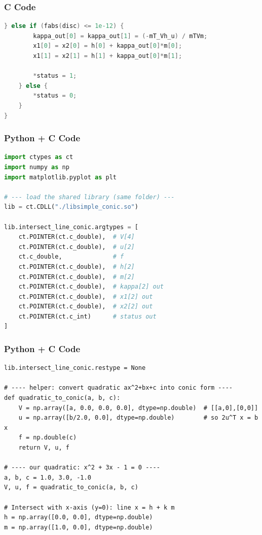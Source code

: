 \documentclass{beamer}
\numberwithin{equation}{section}
\begin{document}
\begin{frame}[fragile]
\frametitle{C Code }
\begin{lstlisting}[language=C]
    } else if (fabs(disc) <= 1e-12) {
        kappa_out[0] = kappa_out[1] = (-mT_Vh_u) / mTVm;
        x1[0] = x2[0] = h[0] + kappa_out[0]*m[0];
        x1[1] = x2[1] = h[1] + kappa_out[0]*m[1];
        
        *status = 1;
    } else {
        *status = 0;
    }
}
\end{lstlisting}
\end{frame}
\begin{frame}[fragile]
\frametitle{Python + C Code }
\begin{lstlisting}[language=Python]
import ctypes as ct
import numpy as np
import matplotlib.pyplot as plt

# --- load the shared library (same folder) ---
lib = ct.CDLL("./libsimple_conic.so")

lib.intersect_line_conic.argtypes = [
    ct.POINTER(ct.c_double),  # V[4]
    ct.POINTER(ct.c_double),  # u[2]
    ct.c_double,              # f
    ct.POINTER(ct.c_double),  # h[2]
    ct.POINTER(ct.c_double),  # m[2]
    ct.POINTER(ct.c_double),  # kappa[2] out
    ct.POINTER(ct.c_double),  # x1[2] out
    ct.POINTER(ct.c_double),  # x2[2] out
    ct.POINTER(ct.c_int)      # status out
]
\end{lstlisting}

\end{frame}
\begin{frame}[fragile]
    \frametitle{Python + C Code}
    \begin{lstlisting}
lib.intersect_line_conic.restype = None

# ---- helper: convert quadratic ax^2+bx+c into conic form ----
def quadratic_to_conic(a, b, c):
    V = np.array([a, 0.0, 0.0, 0.0], dtype=np.double)  # [[a,0],[0,0]]
    u = np.array([b/2.0, 0.0], dtype=np.double)        # so 2u^T x = b x
    f = np.double(c)
    return V, u, f

# ---- our quadratic: x^2 + 3x - 1 = 0 ----
a, b, c = 1.0, 3.0, -1.0
V, u, f = quadratic_to_conic(a, b, c)

# Intersect with x-axis (y=0): line x = h + k m
h = np.array([0.0, 0.0], dtype=np.double)
m = np.array([1.0, 0.0], dtype=np.double)

\end{lstlisting}
\end{frame}
\end{document}
